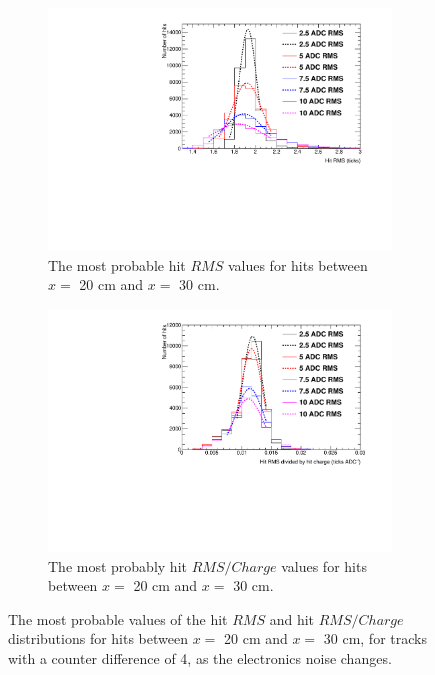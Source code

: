 \begin{figure}[h!]
  \centering
  \begin{subfigure}{0.45\textwidth}
    \centering
    \includegraphics[width=\textwidth]{Canvas_RMS_20cm_NoiseLevel}
    \caption{The most probable hit $RMS$ values for hits between $x =$ 20 cm and $x =$ 30 cm.}
  \end{subfigure}
  \hspace{0.08\textwidth}
  \begin{subfigure}{0.45\textwidth}
    \centering
    \includegraphics[width=\textwidth]{Canvas_RMS_Q_20cm_NoiseLevel}
    \caption{The most probably hit $RMS/Charge$ values for hits between $x =$ 20 cm and $x =$ 30 cm.}
  \end{subfigure}
  \caption[The most probable values of the hit $RMS$ and hit $RMS/Charge$ distributions for tracks with a counter difference of 4, as the electronics noise changes]
          {The most probable values of the hit $RMS$ and hit $RMS/Charge$ distributions for hits between $x =$ 20 cm and $x =$ 30 cm, for tracks with a counter difference of 4, as the electronics noise changes.}
  \label{fig:DiffNoiseStudy_HitFit}
\end{figure}

